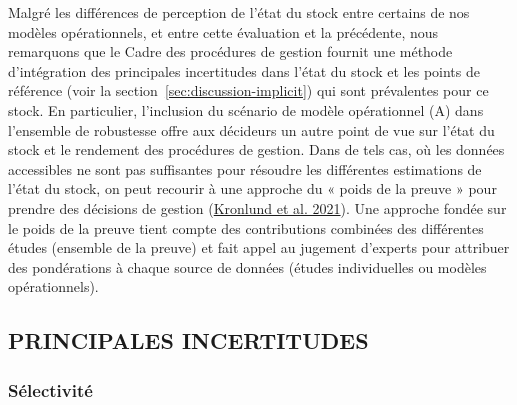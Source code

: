\documentclass[french,11pt]{book}
\begin{document}
Malgré les différences de perception de l'état du stock entre certains de nos modèles opérationnels, et entre cette évaluation et la précédente, nous remarquons que le Cadre des procédures de gestion fournit une méthode d'intégration des principales incertitudes dans l'état du stock et les points de référence (voir la section~\ref{sec:discussion-implicit}) qui sont prévalentes pour ce stock. En particulier, l'inclusion du scénario de modèle opérationnel (A) dans l'ensemble de robustesse offre aux décideurs un autre point de vue sur l'état du stock et le rendement des procédures de gestion. Dans de tels cas, où les données accessibles ne sont pas suffisantes pour résoudre les différentes estimations de l'état du stock, on peut recourir à une approche du « poids de la preuve » pour prendre des décisions de gestion (\protect\hyperlink{ref-kronlund2020}{Kronlund et al. 2021}). Une approche fondée sur le poids de la preuve tient compte des contributions combinées des différentes études (ensemble de la preuve) et fait appel au jugement d'experts pour attribuer des pondérations à chaque source de données (études individuelles ou modèles opérationnels).

\hypertarget{sec:discussion-uncertainties}{%
\subsection{PRINCIPALES INCERTITUDES}\label{sec:discussion-uncertainties}}

\hypertarget{sec:discussion-uncertainties-selectivity}{%
\subsubsection{Sélectivité}\label{sec:discussion-uncertainties-selectivity}}
\end{document}
